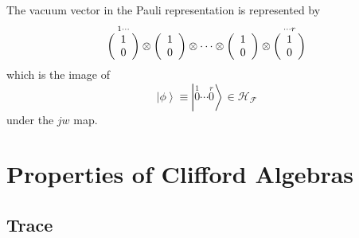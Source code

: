 \documentclass[aps,preprint]{revtex4}%
\begin{document}
The vacuum vector in the Pauli representation is represented by
\begin{equation}
\overset{1\cdots}{\left(
\begin{array}
[c]{c}%
1\\
0
\end{array}
\right)  }\otimes\left(
\begin{array}
[c]{c}%
1\\
0
\end{array}
\right)  \otimes\cdots\otimes\left(
\begin{array}
[c]{c}%
1\\
0
\end{array}
\right)  \otimes\overset{\cdots r}{\left(
\begin{array}
[c]{c}%
1\\
0
\end{array}
\right)  }%
\end{equation}
which is the image of
\begin{equation}
\left\vert \phi\right\rangle \equiv\left\vert \overset{1}{0}\cdots
\overset{r}{0}\right\rangle \in\mathcal{H}_{\mathcal{F}}%
\end{equation}
under the $jw$ map.

\section{Properties of Clifford Algebras}

\subsection{Trace}
\end{document}
